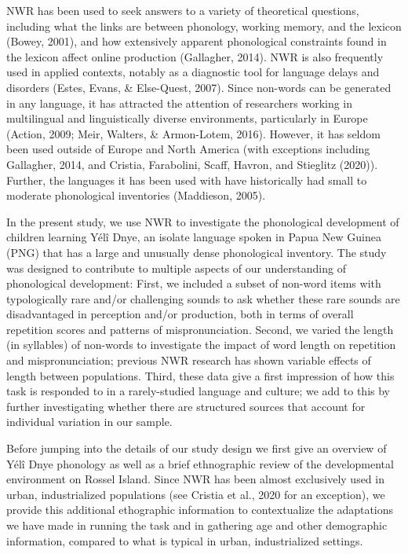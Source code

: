 \documentclass[english,,man,floatsintext]{apa6}
\begin{document}
NWR has been used to seek answers to a variety of theoretical questions,
including what the links are between phonology, working memory, and the
lexicon (Bowey, 2001), and how extensively apparent phonological
constraints found in the lexicon affect online production (Gallagher,
2014). NWR is also frequently used in applied contexts, notably as a
diagnostic tool for language delays and disorders (Estes, Evans, \&
Else-Quest, 2007). Since non-words can be generated in any language, it
has attracted the attention of researchers working in multilingual and
linguistically diverse environments, particularly in Europe (Action,
2009; Meir, Walters, \& Armon-Lotem, 2016). However, it has seldom been
used outside of Europe and North America (with exceptions including
Gallagher, 2014, and Cristia, Farabolini, Scaff, Havron, and Stieglitz
(2020)). Further, the languages it has been used with have historically
had small to moderate phonological inventories (Maddieson, 2005).

In the present study, we use NWR to investigate the phonological
development of children learning Yélî Dnye, an isolate language spoken
in Papua New Guinea (PNG) that has a large and unusually dense
phonological inventory. The study was designed to contribute to multiple
aspects of our understanding of phonological development: First, we
included a subset of non-word items with typologically rare and/or
challenging sounds to ask whether these rare sounds are disadvantaged in
perception and/or production, both in terms of overall repetition scores
and patterns of mispronunciation. Second, we varied the length (in
syllables) of non-words to investigate the impact of word length on
repetition and mispronunciation; previous NWR research has shown
variable effects of length between populations. Third, these data give a
first impression of how this task is responded to in a rarely-studied
language and culture; we add to this by further investigating whether
there are structured sources that account for individual variation in
our sample.

Before jumping into the details of our study design we first give an
overview of Yélî Dnye phonology as well as a brief ethnographic review
of the developmental environment on Rossel Island. Since NWR has been
almost exclusively used in urban, industrialized populations (see
Cristia et al., 2020 for an exception), we provide this additional
ethographic information to contextualize the adaptations we have made in
running the task and in gathering age and other demographic information,
compared to what is typical in urban, industrialized settings.
\end{document}
